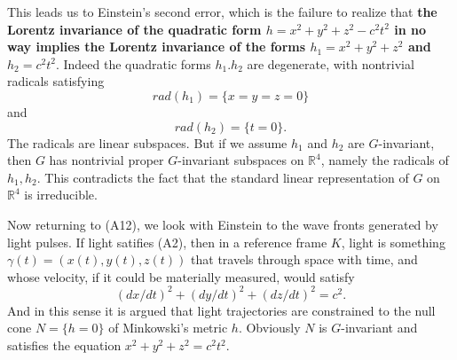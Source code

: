 \documentclass[12pt]{amsart}
\newtheorem*{thm}{Theorem}
\theoremstyle{definition}
\theoremstyle{remark}
\newcommand{\bR}{\mathbb{R}}
\newcommand{\del}{\partial}
\newcommand{\sC}{\mathscr{C}}
\begin{document}
This leads us to Einstein's second error, which is the failure to realize that \textbf{the Lorentz invariance of the quadratic form $h=x^2+y^2+z^2-c^2t^2$ in no way implies the Lorentz invariance of the forms $h_1=x^2+y^2+z^2$ and $h_2=c^2 t^2.$ } Indeed the quadratic forms $h_1. h_2$ are degenerate, with nontrivial radicals satisfying $$rad(h_1)=\{x=y=z=0\}$$ and $$rad(h_2)=\{t=0\}.$$ The radicals are linear subspaces. But if we assume $h_1$ and $h_2$ are $G$-invariant, then $G$ has nontrivial proper $G$-invariant subspaces on $\bR^4$, namely the radicals of $h_1, h_2$. This contradicts the fact that the standard linear representation of $G$ on $\bR^4$ is irreducible. 





Now returning to (A12), we look with Einstein to the wave fronts generated by light pulses. If light satifies (A2), then in a reference frame $K$, light is something $\gamma(t)=(x(t),y(t),z(t))$ that travels through space with time, and whose velocity, if it could be materially measured, would satisfy $$(dx/dt)^2+(dy/dt)^2+(dz/dt)^2=c^2.$$ And in this sense it is argued that light trajectories are constrained to the null cone $N=\{h=0\}$ of Minkowski's metric $h$. Obviously $N$ is $G$-invariant and satisfies the equation $x^2+y^2+z^2=c^2 t^2$. 







\end{document}
